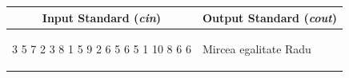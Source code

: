 \documentclass[12pt,a4paper]{article}
\begin{document}
\begin{tabular}{|@{}p{}@{}|@{}p{}@{}|}
\hline
\multicolumn{1}{|c|}{\bfseries Input Standard (\textit{cin})} &
\multicolumn{1}{c|}{\bfseries Output Standard (\textit{cout})} \\
\hline
\begin{textQuoteCell}
3
5
7 2 3 8 1
5
9 2 6 5 6
5
1 10 8 6 6
\end{textQuoteCell} &
\begin{textQuoteCell}
Mircea
egalitate
Radu
\end{textQuoteCell} \\    
\hline
\end{tabular}
\vspace{1em}
\end{document}
